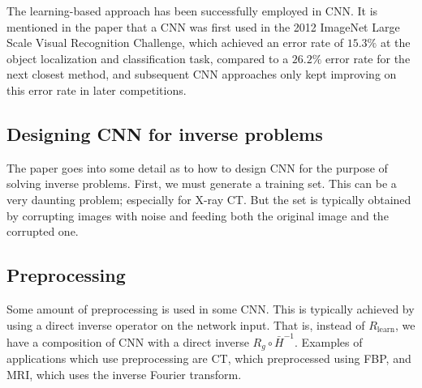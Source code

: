 The learning-based approach has been successfully employed in CNN. It is
mentioned in the paper that a CNN was first used in the 2012 ImageNet Large
Scale Visual Recognition Challenge, which achieved an error rate of $15.3\%$ at
the object localization and classification task, compared to a $26.2\%$ error
rate for the next closest method, and subsequent CNN approaches only kept
improving on this error rate in later competitions.

\subsection{Designing CNN for inverse problems}
The paper goes into some detail as to how to design CNN for the purpose of
solving inverse problems. First, we must generate a training set. This can be a
very daunting problem; especially for X-ray CT. But the set is typically
obtained by corrupting images with noise and feeding both the original image and
the corrupted one.

\subsection{Preprocessing}
Some amount of preprocessing is used in some CNN. This is typically achieved by
using a direct inverse operator on the network input. That is, instead of
$R_{\text{learn}}$, we have a composition of CNN with a direct inverse $R_g\circ
\bar H^{-1}$. Examples of applications which use preprocessing are CT, which
preprocessed using FBP, and MRI, which uses the inverse Fourier transform.


